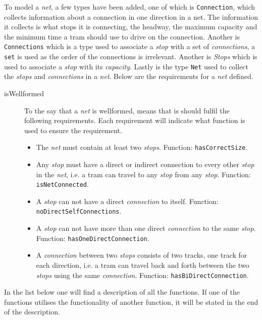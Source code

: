 \documentclass[a4]{article}
\begin{document}
\noindent To model a \emph{net}, a few types have been added, one of which is \verb=Connection=, which collects information about a connection in one direction in a net. The information it collects is what stops it is connecting, the headway, the maximum capacity and the minimum time a tram should use to drive on the connection. Another is \verb=Connections= which is a type used to associate a \emph{stop} with a set of \emph{connections}, a \verb=set= is used as the order of the connections is irrelevant. Another is \emph{Stops} which is used to associate a \emph{stop} with its \emph{capacity}. Lastly is the type \verb=Net= used to collect the \emph{stops} and \emph{connections} in a \emph{net}. Below are the requirements for a \emph{net} defined.
\\
\begin{description}
    \item[isWellformed] To the say that a \emph{net} is wellformed, means that is should fulfil the following requirements. Each requirement will indicate what function is used to ensure the requirement.
        \begin{itemize}
            \item The \emph{net} must contain at least two \emph{stops}. Function: \verb=hasCorrectSize=.
            \item Any \emph{stop} must have a direct or indirect connection to every other \emph{stop} in the \emph{net}, i.e. a tram can travel to any \emph{stop} from any \emph{stop}. Function: \verb=isNetConnected=.
            \item A \emph{stop} can not have a direct \emph{connection} to itself. Function: \verb=noDirectSelfConnections=.
            \item A \emph{stop} can not have more than one direct \emph{connection} to the same \emph{stop}. Function: \verb=hasOneDirectConnection=.
            \item A \emph{connection} between two \emph{stops} consists of two tracks, one track for each direction, i.e. a tram can travel back and forth between the two \emph{stops} using the same \emph{connection}. Function: \verb=hasBiDirectConnection=.
        \end{itemize}
\end{description}

\noindent In the list below one will find a description of all the functions. If one of the functions utilises the functionality of another function, it will be stated in the end of the description. \\
\end{document}
